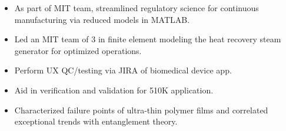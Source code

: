 \documentclass[10.9pt,letterpaper]{altacv}
\newlength{\comlogowidth}
\newcommand{\companylogo}[1]{%
	\savebox{\comlogobox}{\texttt{[image: \#1]}}%
	\settowidth{\comlogowidth}{\usebox{\comlogobox}}
}
\newcommand{\makelogospace}{\hspace*{\comlogowidth}\enspace}
\newcommand{\usecompanylogo}{\raisebox{0pt}[1em]{\usebox{\comlogobox}}\enspace}
\begin{document}
	\begin{itemize}
		\item As part of MIT team, streamlined regulatory science for continuous manufacturing via reduced
		models in MATLAB.
	\end{itemize}
	\divider
	
	\begin{itemize}
	\item Led an MIT team of 3 in finite element modeling the heat recovery steam generator for optimized operations.
	\end{itemize}
	\divider
	
	\begin{itemize}
	\item Perform UX QC/testing via JIRA of biomedical device app.
	\item Aid in verification and validation for 510K application.
	\end{itemize}
	\divider
	
	\begin{itemize}
	\item Characterized failure points of ultra-thin polymer films and correlated exceptional trends with entanglement theory.
	\end{itemize}
 
    \cvsection{}
	
	
	
	
\end{document}
